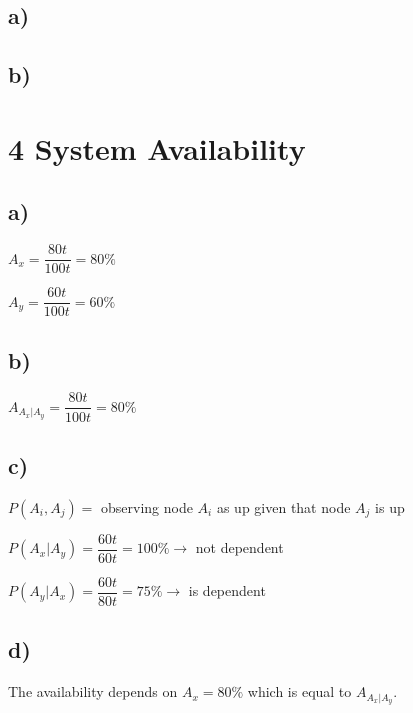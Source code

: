 \documentclass{scrartcl}
\begin{document}
\subsection*{a)}
\subsection*{b)}

\section*{4 System Availability}
\subsection*{a)}
$ A_x = \dfrac{80t}{100t} = 80\% $

$ A_y = \dfrac{60t}{100t} = 60\%$
\subsection*{b)}

$ A_{A_x|A_y} = \dfrac{80t}{100t} = 80\% $
\subsection*{c)}
$ P(A_i, A_j) = $ observing node $ A_i $ as up given that node $ A_j $ is up

$ P(A_x|A_y) = \dfrac{60t}{60t} = 100\% \rightarrow$ not dependent

$ P(A_y|A_x) = \dfrac{60t}{80t} = 75\% \rightarrow$ is dependent
\subsection*{d)}
The availability depends on $ A_x = 80\% $ which is equal to $ A_{A_x|A_y} $.
\end{document}
